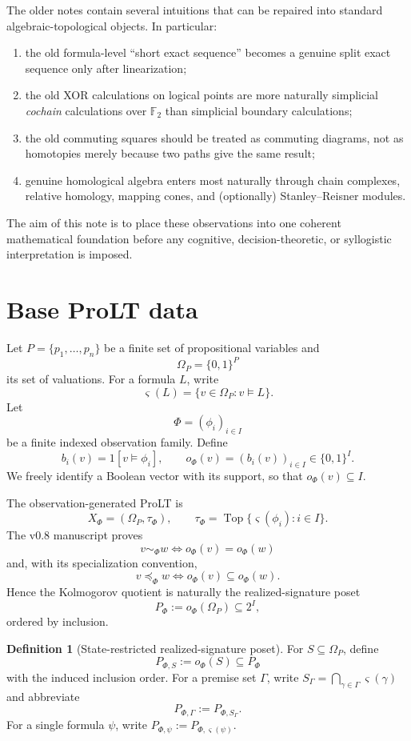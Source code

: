 \documentclass[11pt]{article}
\theoremstyle{definition}
\newtheorem{definition}[theorem]{Definition}
\newcommand{\F}{\mathbb F_2}
\newcommand{\Om}{\Omega_P}
\newcommand{\truth}{\varsigma}
\begin{document}
The older notes contain several intuitions that can be repaired into standard algebraic-topological objects. In particular:
\begin{enumerate}[label=(\roman*)]
\item the old formula-level ``short exact sequence'' becomes a genuine split exact sequence only after linearization;
\item the old XOR calculations on logical points are more naturally simplicial \emph{cochain} calculations over $\F$ than simplicial boundary calculations;
\item the old commuting squares should be treated as commuting diagrams, not as homotopies merely because two paths give the same result;
\item genuine homological algebra enters most naturally through chain complexes, relative homology, mapping cones, and (optionally) Stanley--Reisner modules.
\end{enumerate}

The aim of this note is to place these observations into one coherent mathematical foundation before any cognitive, decision-theoretic, or syllogistic interpretation is imposed.

\section{Base ProLT data}

Let $P=\{p_1,\dots,p_n\}$ be a finite set of propositional variables and
\[
\Om=\{0,1\}^{P}
\]
its set of valuations. For a formula $L$, write
\[
\truth(L)=\{v\in\Om:v\models L\}.
\]
Let
\[
\Phi=(\phi_i)_{i\in I}
\]
be a finite indexed observation family. Define
\[
b_i(v)=1[v\models\phi_i],\qquad
o_\Phi(v)=(b_i(v))_{i\in I}\in\{0,1\}^{I}.
\]
We freely identify a Boolean vector with its support, so that $o_\Phi(v)\subseteq I$.

The observation-generated ProLT is
\[
X_\Phi=(\Om,\tau_\Phi),\qquad
\tau_\Phi=\operatorname{Top}\{\truth(\phi_i):i\in I\}.
\]
The v0.8 manuscript proves
\[
v\sim_\Phi w\iff o_\Phi(v)=o_\Phi(w)
\]
and, with its specialization convention,
\[
v\preceq_\Phi w\iff o_\Phi(v)\subseteq o_\Phi(w).
\]
Hence the Kolmogorov quotient is naturally the realized-signature poset
\[
P_\Phi:=o_\Phi(\Om)\subseteq 2^I,
\]
ordered by inclusion.

\begin{definition}[State-restricted realized-signature poset]
For $S\subseteq\Om$, define
\[
P_{\Phi,S}:=o_\Phi(S)\subseteq P_\Phi
\]
with the induced inclusion order. For a premise set $\Gamma$, write $S_\Gamma=\bigcap_{\gamma\in\Gamma}\truth(\gamma)$ and abbreviate
\[
P_{\Phi,\Gamma}:=P_{\Phi,S_\Gamma}.
\]
For a single formula $\psi$, write $P_{\Phi,\psi}:=P_{\Phi,\truth(\psi)}$.
\end{definition}
\end{document}
